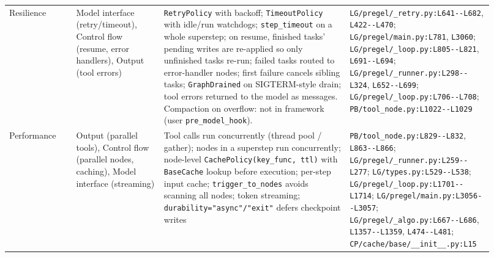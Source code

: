 \begin{longtable}{@{}p{0.13\linewidth}p{0.17\linewidth}p{0.36\linewidth}p{0.26\linewidth}@{}}
Resilience & Model interface (retry/timeout), Control flow (resume, error handlers), Output (tool errors) & \texttt{RetryPolicy} with backoff; \texttt{TimeoutPolicy} with idle/run watchdogs; \texttt{step\_\allowbreak{}timeout} on a whole superstep; on resume, finished tasks' pending writes are re-applied so only unfinished tasks re-run; failed tasks routed to error-handler nodes; first failure cancels sibling tasks; \texttt{GraphDrained} on SIGTERM-style drain; tool errors returned to the model as messages. Compaction on overflow: not in framework (user \texttt{pre\_\allowbreak{}model\_\allowbreak{}hook}). & \texttt{LG/\allowbreak{}pregel/\allowbreak{}\_\allowbreak{}retry.\allowbreak{}py:\allowbreak{}L641-\allowbreak{}-\allowbreak{}L682}, \texttt{L422-\allowbreak{}-\allowbreak{}L470}; \texttt{LG/\allowbreak{}pregel/\allowbreak{}main.\allowbreak{}py:\allowbreak{}L781}, \texttt{L3060}; \texttt{LG/\allowbreak{}pregel/\allowbreak{}\_\allowbreak{}loop.\allowbreak{}py:\allowbreak{}L805-\allowbreak{}-\allowbreak{}L821}, \texttt{L691-\allowbreak{}-\allowbreak{}L694}; \texttt{LG/\allowbreak{}pregel/\allowbreak{}\_\allowbreak{}runner.\allowbreak{}py:\allowbreak{}L298-\allowbreak{}-\allowbreak{}L324}, \texttt{L652-\allowbreak{}-\allowbreak{}L699}; \texttt{LG/\allowbreak{}pregel/\allowbreak{}\_\allowbreak{}loop.\allowbreak{}py:\allowbreak{}L706-\allowbreak{}-\allowbreak{}L708}; \texttt{PB/\allowbreak{}tool\_\allowbreak{}node.\allowbreak{}py:\allowbreak{}L1022-\allowbreak{}-\allowbreak{}L1029} \\
Performance & Output (parallel tools), Control flow (parallel nodes, caching), Model interface (streaming) & Tool calls run concurrently (thread pool / gather); nodes in a superstep run concurrently; node-level \texttt{CachePolicy(\allowbreak{}key\_\allowbreak{}func, ttl)} with \texttt{BaseCache} lookup before execution; per-step input cache; \texttt{trigger\_\allowbreak{}to\_\allowbreak{}nodes} avoids scanning all nodes; token streaming; \texttt{durability="async"/\allowbreak{}"exit"} defers checkpoint writes & \texttt{PB/\allowbreak{}tool\_\allowbreak{}node.\allowbreak{}py:\allowbreak{}L829-\allowbreak{}-\allowbreak{}L832}, \texttt{L863-\allowbreak{}-\allowbreak{}L866}; \texttt{LG/\allowbreak{}pregel/\allowbreak{}\_\allowbreak{}runner.\allowbreak{}py:\allowbreak{}L259-\allowbreak{}-\allowbreak{}L277}; \texttt{LG/\allowbreak{}types.\allowbreak{}py:\allowbreak{}L529-\allowbreak{}-\allowbreak{}L538}; \texttt{LG/\allowbreak{}pregel/\allowbreak{}\_\allowbreak{}loop.\allowbreak{}py:\allowbreak{}L1701-\allowbreak{}-\allowbreak{}L1714}; \texttt{LG/\allowbreak{}pregel/\allowbreak{}main.\allowbreak{}py:\allowbreak{}L3056-\allowbreak{}-\allowbreak{}L3057}; \texttt{LG/\allowbreak{}pregel/\allowbreak{}\_\allowbreak{}algo.\allowbreak{}py:\allowbreak{}L667-\allowbreak{}-\allowbreak{}L686}, \texttt{L1357-\allowbreak{}-\allowbreak{}L1359}, \texttt{L474-\allowbreak{}-\allowbreak{}L481}; \texttt{CP/\allowbreak{}cache/\allowbreak{}base/\allowbreak{}\_\allowbreak{}\_\allowbreak{}init\_\allowbreak{}\_\allowbreak{}.\allowbreak{}py:\allowbreak{}L15} \\

\end{longtable}
